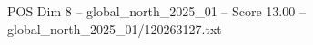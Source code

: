 \begin{textsample}{POS Dim 8 – global\_north\_2025\_01 – Score 13.00 – global\_north\_2025\_01/120263127.txt}
\end{textsample}
